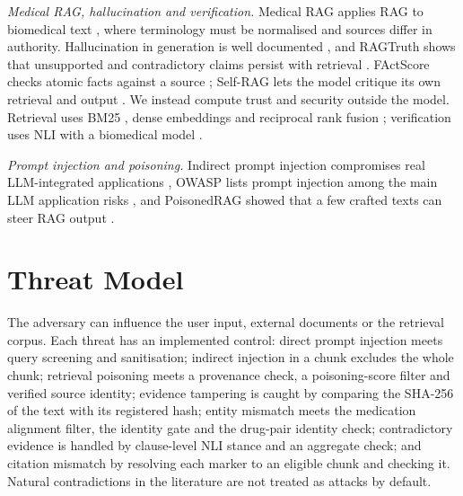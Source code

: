 \documentclass[conference]{IEEEtran}
\begin{document}
\emph{Medical RAG, hallucination and verification.} Medical RAG applies RAG \cite{lewis2020rag} to biomedical text
\cite{xiong2024medrag}, where terminology must be normalised \cite{nelson2011rxnorm} and sources differ in authority.
Hallucination in generation is well documented \cite{ji2023survey}, and RAGTruth shows that unsupported and contradictory
claims persist with retrieval \cite{niu2024ragtruth}. FActScore checks atomic facts against a source
\cite{min2023factscore}; Self-RAG lets the model critique its own retrieval and output \cite{asai2024selfrag}. We instead
compute trust and security outside the model. Retrieval uses BM25 \cite{robertson2009bm25}, dense embeddings
\cite{karpukhin2020dpr,reimers2019sbert} and reciprocal rank fusion \cite{cormack2009rrf}; verification uses NLI
\cite{bowman2015snli} with a biomedical model \cite{gu2021pubmedbert,romanov2018mednli}.

\emph{Prompt injection and poisoning.} Indirect prompt injection compromises real LLM-integrated applications
\cite{greshake2023indirect}, OWASP lists prompt injection among the main LLM application risks \cite{owasp2025llm}, and
PoisonedRAG showed that a few crafted texts can steer RAG output \cite{zou2025poisonedrag}.


\section{Threat Model}
\label{sec:threat}

The adversary can influence the user input, external documents or the retrieval corpus. Each threat has an implemented
control: direct prompt injection meets query screening and sanitisation; indirect injection in a chunk excludes the
whole chunk; retrieval poisoning meets a provenance check, a poisoning-score filter and verified source identity;
evidence tampering is caught by comparing the SHA-256 of the text with its registered hash; entity mismatch meets the
medication alignment filter, the identity gate and the drug-pair identity check; contradictory evidence is handled by
clause-level NLI stance and an aggregate check; and citation mismatch by resolving each marker to an eligible chunk and
checking it. Natural contradictions in the literature are not treated as attacks by default.

\end{document}
